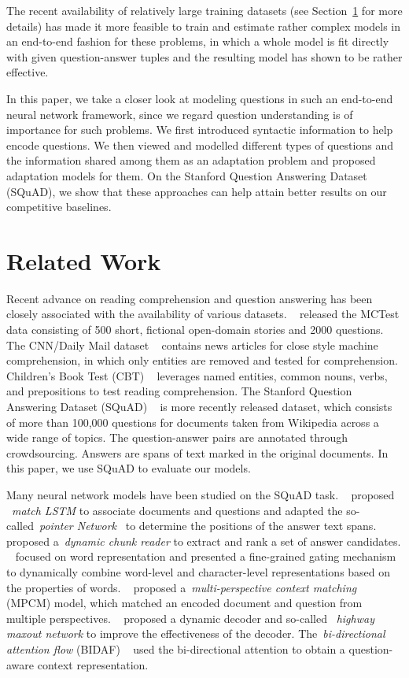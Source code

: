 \documentclass{article}
\begin{document}
The recent availability of relatively large training datasets (see Section~\ref{sec:related} for more details) has made it more feasible to train and estimate rather complex models in an end-to-end fashion for these problems, in which a whole model is fit directly with given question-answer tuples and the resulting model has shown to be rather effective.  

In this paper, we take a closer look at modeling questions in such an end-to-end neural network framework, since we regard question understanding is of importance for such problems. We first introduced syntactic information to help encode questions. We then viewed and modelled different types of questions and the information shared among them as an adaptation problem and proposed adaptation models for them. On the Stanford Question Answering Dataset (SQuAD), we show that these approaches can help attain better results on our competitive baselines. 


\section{Related Work}
\label{sec:related}
Recent advance on reading comprehension and question answering has been closely associated with the availability of various datasets. ~\cite{richardson2013mctest} released the MCTest data consisting of 500 short, fictional open-domain stories and 2000 questions. The CNN/Daily Mail dataset ~\citep{hermann2015teaching} contains news articles for close style machine comprehension, in which only entities are removed and tested for comprehension. Children's Book Test (CBT) ~\citep{hill2015goldilocks} leverages named entities, common nouns, verbs, and prepositions to test reading comprehension. The Stanford Question Answering Dataset (SQuAD) ~\citep{rajpurkar2016squad} is more recently released dataset, which consists of more than 100,000 questions for documents taken from Wikipedia across a wide range of topics. The question-answer pairs are annotated through crowdsourcing. Answers are spans of text marked in the original documents. In this paper, we use SQuAD to evaluate our models.

Many neural network models have been studied on the SQuAD task. ~\cite{wang2016machine} proposed ~\textit{match LSTM} to associate documents and questions and adapted the so-called~\textit{pointer Network}~\citep{vinyals2015pointer} to determine the positions of the answer text spans. ~\cite{yu2016end} proposed a~\textit{dynamic chunk reader} to extract and rank a set of answer candidates. ~\cite{yang2016words} focused on word representation and presented a fine-grained gating mechanism to dynamically combine word-level and character-level representations based on the properties of words. ~\cite{wang2016multi} proposed a~\textit{multi-perspective context matching} (MPCM) model, which matched an encoded document and question from multiple perspectives. ~\cite{xiong2016dynamic} proposed a dynamic decoder and so-called ~\textit{highway maxout network} to improve the effectiveness of the decoder. The~\textit{bi-directional attention flow} (BIDAF) ~\citep{seo2016bidirectional} used the bi-directional attention to obtain a question-aware context representation.
\end{document}
